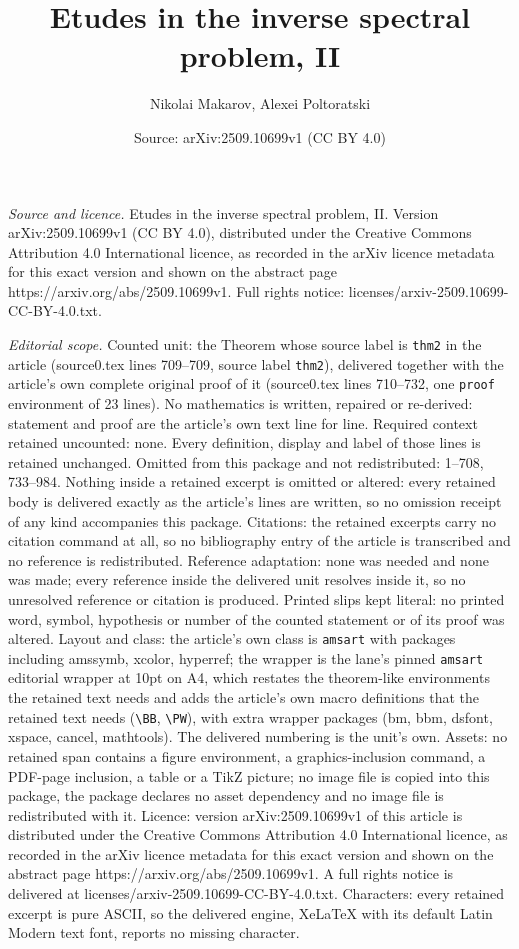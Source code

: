 \documentclass[10pt,a4paper]{amsart}
\title[Etudes in the inverse spectral problem, II]{Etudes in the inverse spectral problem, II}
\author{Nikolai Makarov, Alexei Poltoratski}
\date{Source: arXiv:2509.10699v1 (CC BY 4.0)}
\begin{document}
\maketitle

\noindent\emph{Source and licence.} Etudes in the inverse spectral problem, II. Version arXiv:2509.10699v1 (CC BY 4.0), distributed under the Creative Commons Attribution 4.0 International licence, as recorded in the arXiv licence metadata for this exact version and shown on the abstract page https://arxiv.org/abs/2509.10699v1. Full rights notice: licenses/arxiv-2509.10699-CC-BY-4.0.txt.\par\smallskip

\noindent\textit{Editorial scope.} Counted unit: the Theorem whose source label is \texttt{thm2} in the article (source0.tex lines 709--709, source label \texttt{thm2}), delivered together with the article's own complete original proof of it (source0.tex lines 710--732, one \texttt{proof} environment of 23 lines). No mathematics is written, repaired or re-derived: statement and proof are the article's own text line for line. Required context retained uncounted: none. Every definition, display and label of those lines is retained unchanged. Omitted from this package and not redistributed: 1--708, 733--984. Nothing inside a retained excerpt is omitted or altered: every retained body is delivered exactly as the article's lines are written, so no omission receipt of any kind accompanies this package. Citations: the retained excerpts carry no citation command at all, so no bibliography entry of the article is transcribed and no reference is redistributed. Reference adaptation: none was needed and none was made; every reference inside the delivered unit resolves inside it, so no unresolved reference or citation is produced. Printed slips kept literal: no printed word, symbol, hypothesis or number of the counted statement or of its proof was altered. Layout and class: the article's own class is \texttt{amsart} with packages including amssymb, xcolor, hyperref; the wrapper is the lane's pinned \texttt{amsart} editorial wrapper at 10pt on A4, which restates the theorem-like environments the retained text needs and adds the article's own macro definitions that the retained text needs (\texttt{\textbackslash BB}, \texttt{\textbackslash PW}), with extra wrapper packages (bm, bbm, dsfont, xspace, cancel, mathtools). The delivered numbering is the unit's own. Assets: no retained span contains a figure environment, a graphics-inclusion command, a PDF-page inclusion, a table or a TikZ picture; no image file is copied into this package, the package declares no asset dependency and no image file is redistributed with it. Licence: version arXiv:2509.10699v1 of this article is distributed under the Creative Commons Attribution 4.0 International licence, as recorded in the arXiv licence metadata for this exact version and shown on the abstract page https://arxiv.org/abs/2509.10699v1. A full rights notice is delivered at licenses/arxiv-2509.10699-CC-BY-4.0.txt. Characters: every retained excerpt is pure ASCII, so the delivered engine, XeLaTeX with its default Latin Modern text font, reports no missing character.
\end{document}
